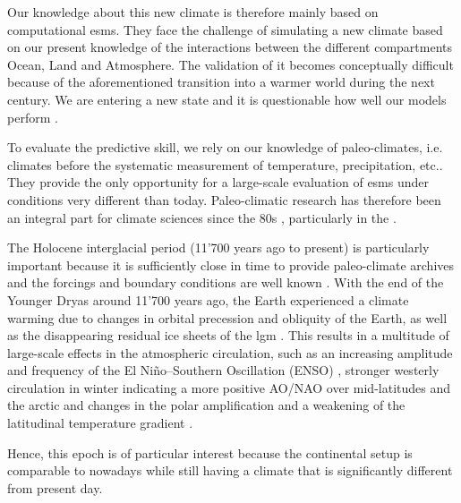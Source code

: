 \begin{refsection}
Our knowledge about this new climate is therefore mainly based on computational \glspl{esm}. They face the challenge of simulating a new climate based on our present knowledge of the interactions between the different compartments Ocean, Land and Atmosphere. The validation of it becomes conceptually difficult because of the aforementioned transition into a warmer world during the next century. We are entering a new state and it is questionable how well our models perform \citep{HargreavesAnnanOhgaitoEtAl2013, MauriDavisCollinsEtAl2014}.

To evaluate the predictive skill, we rely on our knowledge of paleo-climates, i.e. climates before the systematic measurement of temperature, precipitation, etc.. They provide the only opportunity for a large-scale evaluation of \glspl{esm} under conditions very different than today. Paleo-climatic research has therefore been an integral part for climate sciences since the 80s \citep{COHMAPMembers1988, JoussaumeTaylor1995}, particularly in the  \citep{BraconnotOttoBliesnerHarrisonEtAl2007, BraconnotOttoBliesnerHarrisonEtAl2007a, BraconnotHarrisonKageyamaEtAl2012, KageyamaBraconnotHarrisonEtAl2016, Otto-BliesnerBraconnotHarrisonEtAl2017, JungclausBardBaroniEtAl2017}.

The Holocene interglacial period (11'700 years ago to present)  \citep{WalkerJohnsenRasmussenEtAl2009} is particularly important because it is sufficiently close in time to provide paleo-climate archives and the forcings and boundary conditions are well known \citep{WannerBeerButikoferEtAl2008}. With the end of the Younger Dryas around 11'700 years ago, the Earth experienced a climate warming due to changes in orbital precession and obliquity of the Earth, as well as the disappearing residual ice sheets of the \gls{lgm} \citep{BergerLoutre1991, Peltier2004}. This results in a multitude of large-scale effects in the atmospheric circulation, such as an increasing amplitude and frequency of the El Niño–Southern Oscillation (ENSO) \citep{DondersWagnerCremerVisscher2008}, stronger westerly circulation in winter indicating a more positive AO/NAO over mid-latitudes and the arctic \citep{MauriDavisCollinsEtAl2014, FunderGoosseJepsenEtAl2011} and changes in the polar amplification and a weakening of the latitudinal temperature gradient \citep{DavisBrewer2009}.

Hence, this epoch is of particular interest because the continental setup is comparable to nowadays while still having a climate that is significantly different from present day.


\end{refsection}
